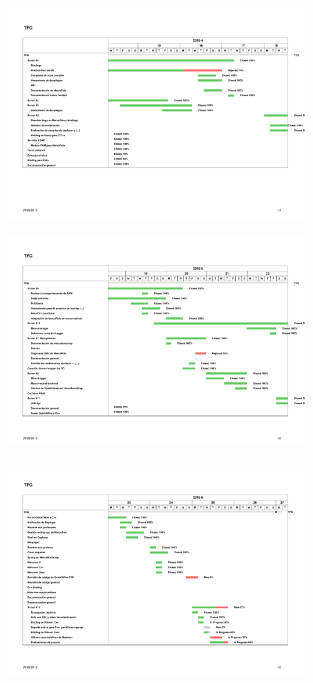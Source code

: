 \begin{figure}[H]
\centering
\includegraphics[width=0.7\textwidth]{Chapters/Chapter10/Figures/tfg-gantt-apr}
\end{figure}
\begin{figure}[H]
\centering
\includegraphics[width=0.7\textwidth]{Chapters/Chapter10/Figures/tfg-gantt-may}
\end{figure}
\begin{figure}[H]
\centering
\includegraphics[width=0.7\textwidth]{Chapters/Chapter10/Figures/tfg-gantt-jun}
\end{figure}
